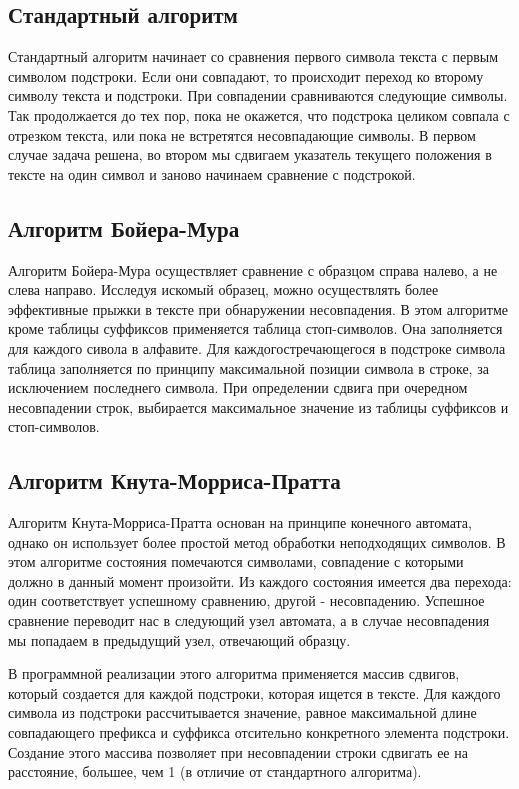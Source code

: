 \documentclass[a4paper,12pt]{report}
\begin{document}
	\subsection{Стандартный алгоритм}

		Стандартный алгоритм начинает со сравнения первого символа текста с первым символом подстроки. 
		Если они совпадают, то происходит переход ко второму символу текста и подстроки. 
		При совпадении сравниваются следующие символы. 
		Так продолжается до тех пор, пока не окажется, что подстрока целиком совпала с отрезком текста, или пока не встретятся несовпадающие символы. 
		В первом случае задача решена, во втором мы сдвигаем указатель текущего положения в тексте на один символ и заново начинаем сравнение с подстрокой\cite{2}.
		
	\subsection{Алгоритм Бойера-Мура}

		Алгоритм Бойера-Мура осуществляет сравнение с образцом справа налево, а не слева направо. 
		Исследуя искомый образец, можно осуществлять более эффективные прыжки в тексте при обнаружении несовпадения. 
		В этом алгоритме кроме таблицы суффиксов применяется таблица стоп-символов. 
		Она заполняется для каждого сивола в алфавите. 
		Для каждогостречающегося в подстроке символа таблица заполняется по принципу максимальной позиции символа в строке, за исключением последнего символа. 
		При определении сдвига при очередном несовпадении строк, выбирается максимальное значение из таблицы суффиксов и стоп-символов\cite{2}.
		
	\subsection{Алгоритм Кнута-Морриса-Пратта}	
		
		Алгоритм Кнута-Морриса-Пратта основан на принципе конечного автомата, однако он использует более простой метод обработки неподходящих символов. 
		В этом алгоритме состояния помечаются символами, совпадение с которыми должно в данный момент произойти. 
		Из каждого состояния имеется два перехода: один соответствует успешному сравнению, другой - несовпадению. 
		Успешное сравнение переводит нас в следующий узел автомата, а в случае несовпадения мы попадаем в предыдущий узел, отвечающий образцу.
		 
		В программной реализации этого алгоритма применяется массив сдвигов, который создается для каждой подстроки, которая ищется в тексте. 
		Для каждого символа из подстроки рассчитывается значение, равное максимальной длине совпадающего префикса и суффикса отсительно конкретного элемента подстроки. 
		Создание этого массива позволяет при несовпадении строки сдвигать ее на расстояние, большее, чем 1 (в отличие от стандартного алгоритма).
		
\end{document}
